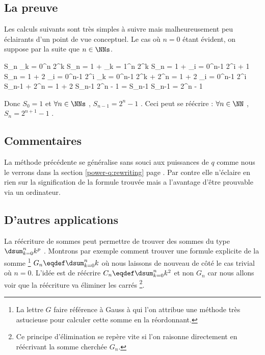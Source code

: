 \subsection{La preuve}

Les calculs suivants sont très simples à suivre mais malheureusement peu éclairants d'un point de vue conceptuel. Le cas où $n = 0$ étant évident, on suppose par la suite que $n \in \NNs$.

\medskip

\begin{explain}[style = sar, ope = \iff]
	S_n \eqdef \dsum_{k = 0}^{n} 2^k
		\explnext{}
	S_n = 1 + \dsum_{k = 1}^{n} 2^k
	S_n = 1 + \dsum_{i = 0}^{n-1} 2^{i + 1}
		\explnext{}
	S_n = 1 + 2 \dsum_{i = 0}^{n-1} 2^i
	\dsum_{k = 0}^{n-1} 2^k + 2^n = 1 + 2 \dsum_{i = 0}^{n-1} 2^i
		\explnext{}
	S_{n-1} + 2^n = 1 + 2 S_{n-1}
		\explnext{}
	2^n - 1 = S_{n-1}
		\explnext{}
	S_{n-1} = 2^n - 1
\end{explain}

\bigskip

Donc $S_0 = 1$ et $\forall n \in \NNs$ , $S_{n-1} = 2^n - 1$ .
Ceci peut se réécrire :
$\forall n \in \NN$ , $S_n = 2^{n+1} - 1$ .




\subsection{Commentaires}

La méthode précédente se généralise sans souci aux puissances de $q$ comme nous le verrons dans la section \ref{power-q:rewriting} page \pageref{power-q:rewriting}.
Par contre elle n'éclaire en rien sur la signification de la formule trouvée mais a l'avantage d'être prouvable via un ordinateur.




\subsection{D'autres applications}

La réécriture de sommes peut permettre de trouver des sommes du type $\dsum_{k = 0}^{n} k^p$ .
Montrons par exemple comment trouver une formule explicite de la somme
\footnote{
	La lettre $G$ faire référence à Gauss à qui l'on attribue une méthode très astucieuse pour calculer cette somme en la réordonnant.
}
$G_n \eqdef \dsum_{k = 0}^{n} k$ où nous laissons de nouveau de côté le cas trivial où $n = 0$.
L'idée est de réécrire $C_n \eqdef \dsum_{k = 0}^{n} k^2$ et non $G_n$ car nous allons voir que la réécriture va éliminer les carrés
\footnote{
	Ce principe d'élimination se repère vite si l'on raisonne directement en réécrivant la somme cherchée $G_n$.
}.

